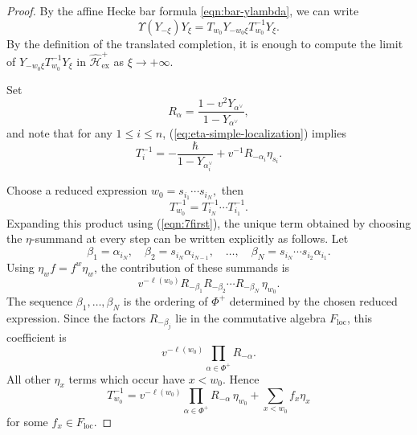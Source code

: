 \documentclass{amsart}
\theoremstyle{definition}
\numberwithin{equation}{section}
\begin{document}
\begin{proof}
By the affine Hecke bar formula \eqref{eqn:bar-ylambda}, we can write
\[
\Upsilon(Y_{-\xi})Y_\xi
=
T_{w_0}Y_{-w_0\xi}T_{w_0}^{-1}Y_\xi.
\]
By the definition of the translated completion, it is enough to compute the
limit of \(Y_{-w_0\xi}T_{w_0}^{-1}Y_\xi\) in
\(\widehat{\mathcal H}_{\mathrm{ex}}^{+}\) as
\(\xi\to+\infty\).

Set
\[
R_\alpha=\frac{1-v^2Y_{\alpha^\vee}}{1-Y_{\alpha^\vee}},
\]
and note that for any $1 \leqslant i\leqslant n$, (\ref{eq:eta-simple-localization}) implies
\begin{equation}
    T_i^{-1}
=
-\frac{\hbar}{1-Y_{\alpha_i^\vee}}
+
v^{-1}R_{-\alpha_i}\eta_{s_i}.\label{eqn:7first}
\end{equation}

Choose a reduced expression  $w_0=s_{i_1}\cdots s_{i_N},$ then
\[
T_{w_0}^{-1}=T_{i_N}^{-1}\cdots T_{i_1}^{-1}.
\]
Expanding this product using (\ref{eqn:7first}), the unique term obtained by choosing the
\(\eta\)-summand at every step can be written explicitly as follows. Let
\[
\beta_1=\alpha_{i_N},\quad
\beta_2=s_{i_N}\alpha_{i_{N-1}},\quad \ldots,\quad
\beta_N=s_{i_N}\cdots s_{i_2}\alpha_{i_1}.
\]
Using \(\eta_w f=f^w\eta_w\), the contribution of these summands is
\[
v^{-\ell(w_0)}R_{-\beta_1}R_{-\beta_2}\cdots R_{-\beta_N}\,\eta_{w_0}.
\]
The sequence \(\beta_1,\ldots,\beta_N\) is the ordering of
\(\Phi^+\) determined by the chosen reduced expression. Since the factors
\(R_{-\beta_j}\) lie in the commutative algebra \(F_{\mathrm{loc}}\), this
coefficient is
\[
v^{-\ell(w_0)}\prod_{\alpha\in\Phi^+}R_{-\alpha}.
\]
All other \(\eta_x\) terms which occur have \(x<w_0\). Hence
\begin{equation}
T_{w_0}^{-1}
=
v^{-\ell(w_0)}\prod_{\alpha\in\Phi^+}R_{-\alpha}\,\eta_{w_0}
+
\sum_{x<w_0} f_x\eta_x\label{eqn:7second}
\end{equation}
for some \(f_x\in F_{\mathrm{loc}}\).


\end{proof}
\end{document}
